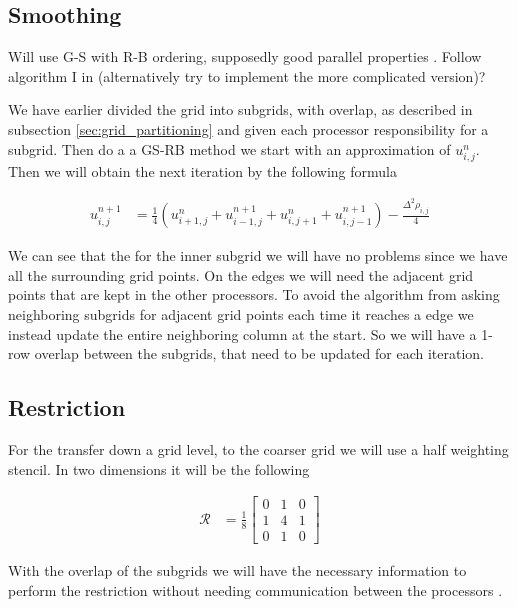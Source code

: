 		\subsection{Smoothing}
			Will use G-S with R-B ordering, supposedly good parallel properties \citep{Chow2006}. Follow algorithm I in \cite{Adams2001} (alternatively try to implement the more complicated version)?

			We have earlier divided the grid into subgrids, with overlap, as described in subsection \ref{sec:grid_partitioning} and given each processor responsibility for a subgrid. Then do a a GS-RB method we start with an approximation of \(u^{n}_{i,j}\). Then we will obtain the next iteration by the following formula

			\begin{align}
				u^{n+1}_{i,j} &= \frac{1}{4}\left( u^n_{i+1,j} + u^{n +1}_{i-1,j} + u^{n}_{i, j+1} + u^{n+1}_{i,j-1}  \right) - \frac{\Delta^2 \rho_{i,j}}{4}
			\end{align}

			We can see that the for the inner subgrid we will have no problems since we have all the surrounding grid points. On the edges we will need the adjacent grid points that are kept in the other processors. To avoid the algorithm from asking neighboring subgrids for adjacent grid points each time it reaches a edge we instead update the entire neighboring column at the start. So we will have a 1-row overlap between the subgrids, that need to be updated for each iteration.


		\subsection{Restriction}
			For the transfer down a grid level, to the coarser grid we will use a half weighting stencil. In two dimensions it will be the following

			\begin{align}
				\mathcal{R} &= \frac{1}{8}
				\begin{bmatrix}
					0 & 1 & 0
					\\
					1 & 4 & 1
					\\
					0 & 1 & 0
				\end{bmatrix}
			\end{align}

			With the overlap of the subgrids we will have the necessary information to perform the restriction without needing communication between the processors \citep{Trottenberg}.

